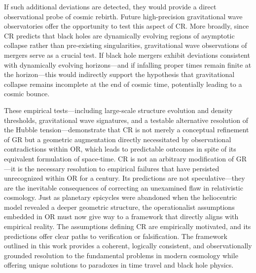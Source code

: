\documentclass[aps,prd,reprint,superscriptaddress]{revtex4-2}
\begin{document}
If such additional deviations are detected, they would provide a direct observational probe of cosmic rebirth. Future high-precision gravitational wave observatories offer the opportunity to test this aspect of CR. More broadly, since CR predicts that black holes are dynamically evolving regions of asymptotic collapse rather than pre-existing singularities, gravitational wave observations of mergers serve as a crucial test. If black hole mergers exhibit deviations consistent with dynamically evolving horizons---and if infalling proper times remain finite at the horizon---this would indirectly support the hypothesis that gravitational collapse remains incomplete at the end of cosmic time, potentially leading to a cosmic bounce.

These empirical tests---including large-scale structure evolution and density thresholds, gravitational wave signatures, and a testable alternative resolution of the Hubble tension---demonstrate that CR is not merely a conceptual refinement of GR but a geometric augmentation directly necessitated by observational contradictions within OR, which leads to predictable outcomes in spite of its equivalent formulation of space-time. CR is not an arbitrary modification of GR---it is the necessary resolution to empirical failures that have persisted unrecognized within OR for a century. Its predictions are not speculative---they are the inevitable consequences of correcting an unexamined flaw in relativistic cosmology. Just as planetary epicycles were abandoned when the heliocentric model revealed a deeper geometric structure, the operationalist assumptions embedded in OR must now give way to a framework that directly aligns with empirical reality. The assumptions defining CR are empirically motivated, and its predictions offer clear paths to verification or falsification. The framework outlined in this work provides a coherent, logically consistent, and observationally grounded resolution to the fundamental problems in modern cosmology while offering unique solutions to paradoxes in time travel and black hole physics.


\end{document}
